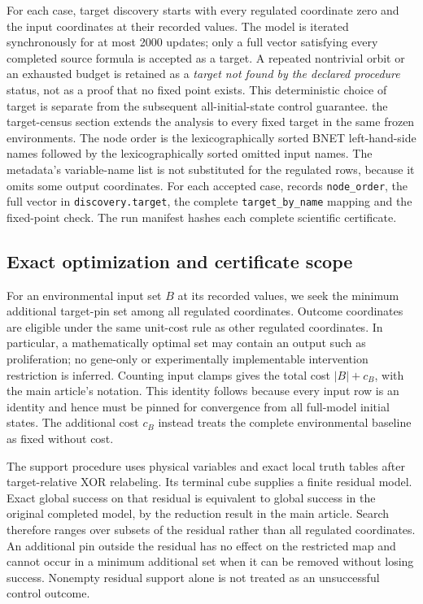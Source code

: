 For each case, target discovery starts with every regulated coordinate
zero and the input coordinates at their recorded values. The model is
iterated synchronously for at most 2000 updates; only a full vector
satisfying every completed source formula is accepted as a target. A
repeated nontrivial orbit or an exhausted budget is retained as a
\emph{target not found by the declared procedure} status, not as a proof
that no fixed point exists. This deterministic choice of target is
separate from the subsequent all-initial-state control guarantee. the target-census section extends the analysis to every fixed target in the same frozen environments.
The node order is the lexicographically sorted BNET left-hand-side
names followed by the lexicographically sorted omitted input names.
The metadata's variable-name list is not substituted for the regulated
rows, because it omits some output coordinates. For each accepted case,
 records \texttt{node\_order}, the
full vector in \texttt{discovery.target}, the complete
\texttt{target\_by\_name} mapping and the fixed-point check. The run
manifest hashes each complete scientific certificate.


\subsection{Exact optimization and certificate scope}\label{sec:largecertificates}
For an environmental input set $B$ at its recorded values, we seek the
minimum additional target-pin set among all regulated coordinates.
Outcome coordinates are eligible under the same unit-cost rule as other
regulated coordinates. In particular, a mathematically optimal set may
contain an output such as proliferation; no gene-only or experimentally
implementable intervention restriction is inferred. Counting input
clamps gives the total cost $|B|+c_B$, with the main article's notation.
This identity follows
because every input row is an identity and hence must be pinned for
convergence from all full-model initial states. The additional cost
$c_B$ instead treats the complete environmental baseline as
fixed without cost.

The support procedure uses physical variables and exact local truth
tables after target-relative XOR relabeling. Its terminal cube supplies
a finite residual model. Exact global success on that residual is
equivalent to global success in the original completed model, by the
reduction result in the main article. Search therefore ranges over
subsets of the residual rather than all regulated coordinates. An
additional pin outside the residual has no effect on the restricted
map and cannot occur in a minimum additional set when it can be removed
without losing success. Nonempty residual support alone is not treated
as an unsuccessful control outcome.

